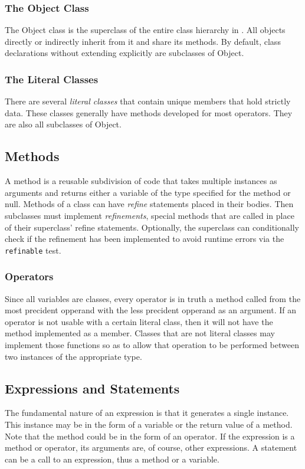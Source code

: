 \subsubsection{The Object Class}
The Object class is the superclass of the entire class hierarchy in \Lang{}. All objects directly or indirectly inherit from it and share its methods. By default, class declarations without extending explicitly are subclasses of Object.

\subsubsection{The Literal Classes}
There are several \textit{literal classes} that contain unique members that hold strictly data. These classes generally have methods developed for most operators. They are also all subclasses of Object.

\subsection{Methods}
A method is a reusable subdivision of code that takes multiple instances as arguments and returns either a variable of the type specified for the method or null. Methods of a class can have \textit{refine} statements placed in their bodies. Then subclasses must implement \textit{refinements}, special methods that are called in place of their superclass' refine statements. Optionally, the superclass can conditionally check if the refinement has been implemented to avoid runtime errors via the \verb!refinable! test.

\subsubsection{Operators}
Since all variables are classes, every operator is in truth a method called from the most precident opperand with the less precident opperand as an argument. If an operator is not usable with a certain literal class, then it will not have the method implemented as a member. Classes that are not literal classes may implement those functions so as to allow that operation to be performed between two instances of the appropriate type.

\subsection{Expressions and Statements}
The fundamental nature of an expression is that it generates a single instance. This instance may be in the form of a variable or the return value of a method. Note that the method could be in the form of an operator. If the expression is a method or operator, its arguments are, of course, other expressions. A statement can be a call to an expression, thus a method or a variable.

